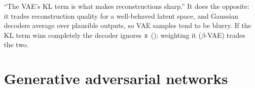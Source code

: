 \begin{remark}
	\trap ``The VAE's KL term is what makes reconstructions sharp.'' It does the opposite: it trades reconstruction
	quality for a well-behaved latent space, and Gaussian decoders average over plausible outputs, so VAE samples
	tend to be blurry. If the KL term wins completely the decoder ignores ${\bm{z}}$ (); weighting
	it ($\beta$-VAE) trades the two.
\end{remark}

\section{Generative adversarial networks}

